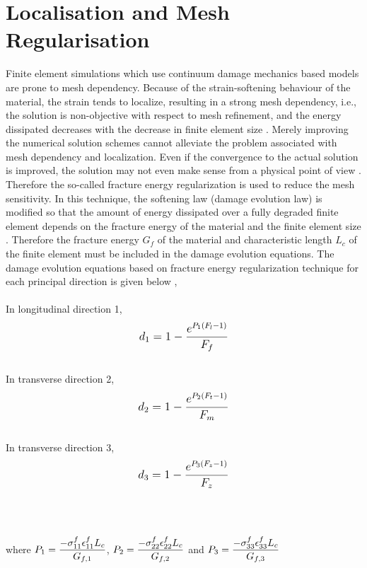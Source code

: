 \documentclass[12pt,a4paper,twoside,openright]{report}
\begin{document}
\section{Localisation and Mesh Regularisation}\label{Mesh Regularisation}
\indent\indent\indent Finite element simulations which use continuum damage mechanics based models are prone to mesh dependency.  Because of the strain-softening behaviour of the material, the strain tends to localize, resulting in a strong mesh dependency, i.e., the solution is non-objective with respect to mesh refinement, and the energy dissipated decreases with the decrease in finite element size \citep{lapczyk2007progressive}. Merely improving the numerical solution schemes cannot alleviate the problem associated with mesh dependency and localization. Even if the convergence to the actual solution is improved, the solution may not even make sense from a physical point of view \citep{peerlings1999enhanced}. Therefore the so-called fracture energy regularization is used to reduce the mesh sensitivity. In this technique, the softening law (damage evolution law) is modified so that the amount of energy dissipated over a fully degraded finite element depends on the fracture energy of the material and the finite element size \citep{cervera2006smeared}. Therefore the fracture energy $G_f$ of the material and characteristic length $L_{c}$ of the finite element must be included in the damage evolution equations. The damage evolution equations based on fracture energy regularization technique for each principal direction is given below \citep{wang2009three}, \\
\\
In longitudinal direction 1,
\begin{equation}
\label{d1}
\mathlarger{d_{1} = 1 - \frac{e^{P_{1}(F_{l} - 1)}}{F_{f}}}
\end{equation}
\\
In transverse direction 2,
\begin{equation}
\label{d2}  
\mathlarger{d_{2} = 1 - \frac{e^{P_{2}(F_{t} - 1)}}{F_{m}}}
\end{equation}
\\
In transverse direction 3,
\begin{equation}
\label{d3} 
\mathlarger{d_{3} = 1 - \frac{e^{P_{3}(F_{z} - 1)}}{F_{z}}}
\end{equation}
\\
\\
\\
where $\mathlarger{P_{1} = \frac{-\sigma_{11}^{f}\epsilon_{11}^{f}L_{c}}{G_{f,1}}}$, $\mathlarger{P_{2} = \frac{-\sigma_{22}^{f}\epsilon_{22}^{f}L_{c}}{G_{f,2}}}$ and $\mathlarger{P_{3} = \frac{-\sigma_{33}^{f}\epsilon_{33}^{f}L_{c}}{G_{f,3}}}$ 
\end{document}
